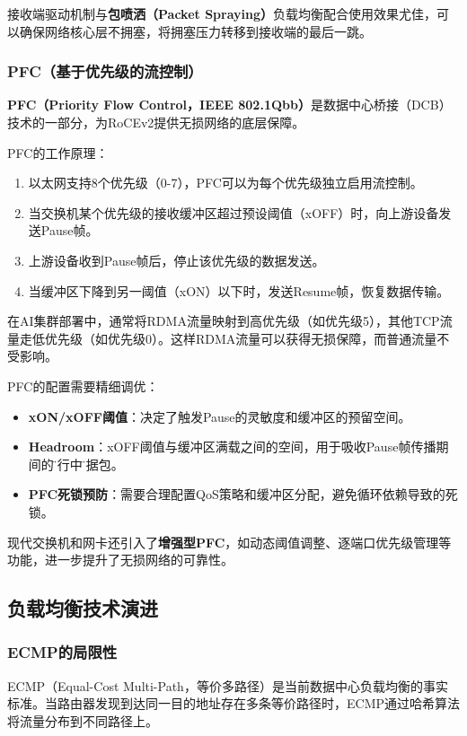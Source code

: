 接收端驱动机制与\textbf{包喷洒（Packet Spraying）}负载均衡配合使用效果尤佳，可以确保网络核心层不拥塞，将拥塞压力转移到接收端的最后一跳。

\subsubsection{PFC（基于优先级的流控制）}

\textbf{PFC（Priority Flow Control，IEEE 802.1Qbb）}是数据中心桥接（DCB）技术的一部分，为RoCEv2提供无损网络的底层保障。

PFC的工作原理：
\begin{enumerate}
    \item 以太网支持8个优先级（0-7），PFC可以为每个优先级独立启用流控制。
    \item 当交换机某个优先级的接收缓冲区超过预设阈值（xOFF）时，向上游设备发送Pause帧。
    \item 上游设备收到Pause帧后，停止该优先级的数据发送。
    \item 当缓冲区下降到另一阈值（xON）以下时，发送Resume帧，恢复数据传输。
\end{enumerate}

在AI集群部署中，通常将RDMA流量映射到高优先级（如优先级5），其他TCP流量走低优先级（如优先级0）。这样RDMA流量可以获得无损保障，而普通流量不受影响。

PFC的配置需要精细调优：
\begin{itemize}
    \item \textbf{xON/xOFF阈值}：决定了触发Pause的灵敏度和缓冲区的预留空间。
    \item \textbf{Headroom}：xOFF阈值与缓冲区满载之间的空间，用于吸收Pause帧传播期间的\"飞行中\"数据包。
    \item \textbf{PFC死锁预防}：需要合理配置QoS策略和缓冲区分配，避免循环依赖导致的死锁。
\end{itemize}

现代交换机和网卡还引入了\textbf{增强型PFC}，如动态阈值调整、逐端口优先级管理等功能，进一步提升了无损网络的可靠性。

\subsection{负载均衡技术演进}

\subsubsection{ECMP的局限性}

ECMP（Equal-Cost Multi-Path，等价多路径）是当前数据中心负载均衡的事实标准。当路由器发现到达同一目的地址存在多条等价路径时，ECMP通过哈希算法将流量分布到不同路径上。

